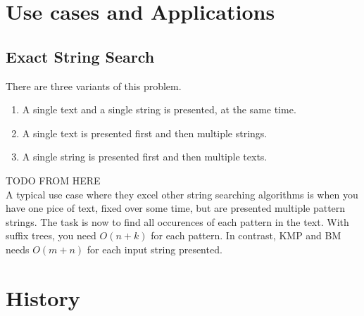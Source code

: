 \documentclass[a4paper]{article}
\begin{document}
\section{Use cases and Applications}

\subsection{Exact String Search}

There are three variants of this problem.
\begin{enumerate}
        \item A single text and a single string is presented, at the same time.
        \item A single text is presented first and then multiple strings.
        \item A single string is presented first and then multiple texts.
\end{enumerate}

TODO FROM HERE
\\
A typical use case where they excel other string searching algorithms is when
you have one pice of text, fixed over some time, but are presented multiple
pattern strings. The task is now to find all occurences of each pattern in the
text. With suffix trees, you need $O(n + k)$ for each pattern. In contrast, KMP
and BM needs $O(m + n)$ for each input string presented.

\section{History}

\medskip



\end{document}
